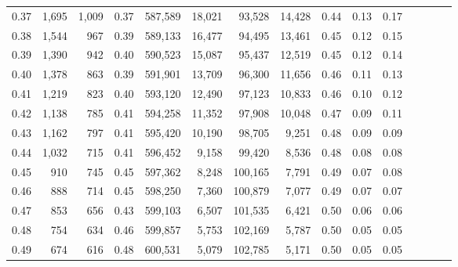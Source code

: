 \begin{tabular}{rrrcrrrrrrrrrrr}
0.37 &   1,695 &  1,009 &                                       0.37 &  587,589 &   18,021 &   93,528 &   14,428 &  0.44 &  0.13 &                         0.17 \\
0.38 &   1,544 &    967 &                                       0.39 &  589,133 &   16,477 &   94,495 &   13,461 &  0.45 &  0.12 &                         0.15 \\
0.39 &   1,390 &    942 &                                       0.40 &  590,523 &   15,087 &   95,437 &   12,519 &  0.45 &  0.12 &                         0.14 \\
0.40 &   1,378 &    863 &                                       0.39 &  591,901 &   13,709 &   96,300 &   11,656 &  0.46 &  0.11 &                         0.13 \\
0.41 &   1,219 &    823 &                                       0.40 &  593,120 &   12,490 &   97,123 &   10,833 &  0.46 &  0.10 &                         0.12 \\
0.42 &   1,138 &    785 &                                       0.41 &  594,258 &   11,352 &   97,908 &   10,048 &  0.47 &  0.09 &                         0.11 \\
0.43 &   1,162 &    797 &                                       0.41 &  595,420 &   10,190 &   98,705 &    9,251 &  0.48 &  0.09 &                         0.09 \\
0.44 &   1,032 &    715 &                                       0.41 &  596,452 &    9,158 &   99,420 &    8,536 &  0.48 &  0.08 &                         0.08 \\
0.45 &     910 &    745 &                                       0.45 &  597,362 &    8,248 &  100,165 &    7,791 &  0.49 &  0.07 &                         0.08 \\
0.46 &     888 &    714 &                                       0.45 &  598,250 &    7,360 &  100,879 &    7,077 &  0.49 &  0.07 &                         0.07 \\
0.47 &     853 &    656 &                                       0.43 &  599,103 &    6,507 &  101,535 &    6,421 &  0.50 &  0.06 &                         0.06 \\
0.48 &     754 &    634 &                                       0.46 &  599,857 &    5,753 &  102,169 &    5,787 &  0.50 &  0.05 &                         0.05 \\
0.49 &     674 &    616 &                                       0.48 &  600,531 &    5,079 &  102,785 &    5,171 &  0.50 &  0.05 &                         0.05 \\

\end{tabular}
